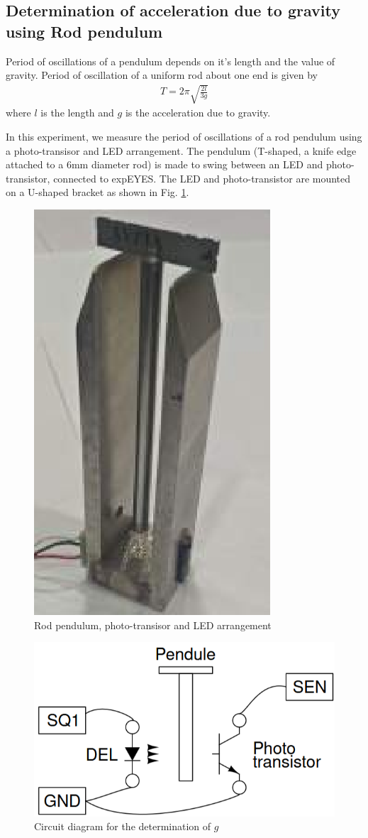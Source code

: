 \subsection{Determination of acceleration due to gravity using Rod pendulum}
Period of oscillations of a pendulum depends on it’s length and the value of gravity. Period of oscillation
of a uniform rod about one end is given by \begin{align}T = 2\pi\sqrt{\frac{2l}{3g}}\end{align}where $l$ is the length and $g$ is the acceleration due to gravity.

In this experiment, we measure the period of oscillations of a rod pendulum using a photo-transisor and LED arrangement.
The pendulum (T-shaped, a knife edge attached to a 6mm diameter rod) is made to swing between an LED
and photo-transistor, connected to expEYES. The LED and photo-transistor are mounted on a U-shaped
bracket as shown in Fig. \ref{th:7}.

\begin{figure}[h]
    \centering
    \includegraphics[width=0.4\columnwidth]{images/knifee.png}
    \caption{Rod pendulum, photo-transisor and LED arrangement}
    \label{th:7}
\end{figure}
\begin{figure}[H]
    \centering
    \includegraphics[width=1\columnwidth]{images/pend.png}
    \caption{Circuit diagram for the determination of $g$}
    \label{th:6}
\end{figure}


